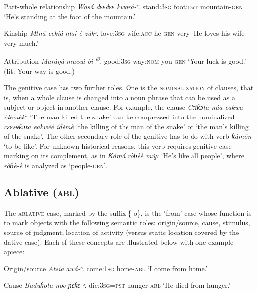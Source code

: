 Part-whole relationship
\textit{Wasá     dɛɛdɛɛ   kwará-}\textit{ᵉ}.
stand:\textsc{3sg}   foot:\textsc{dat}   mountain-\textsc{gen}
‘He’s standing at the foot of the mountain.’




Kinship
\textit{Mɨná     cekíá     ntsí-}\textit{é}\textit{     zùkᵘ.}
love:\textsc{3sg}   wife:\textsc{acc}   he-\textsc{gen}   very
‘He loves his wife very much.’




Attribution
\textit{Maráŋá   muceá   bì-}\textit{\textsuperscript{Ø}}.
good:\textsc{3sg}   way:\textsc{nom}   you-\textsc{gen}
‘Your luck is good.’ (lit: Your way is good.)


The genitive case has two further roles. One is the \textsc{nominalization} of clauses, that is, when a whole clause is changed into a noun phrase that can be used as a subject or object in another clause. For example, the clause \textit{Cɛɨƙɔta náa eakwa ídèmèkᵃ }‘The man killed the snake’ can be compressed into the nominalized \textit{cɛɛsʉƙɔta eakwéé ídèmè }‘the killing of the man of the snake’ or ‘the man’s killing of the snake’. The other secondary role of the genitive has to do with verb \textit{ƙámón }‘to be like’. For unknown historical reasons, this verb requires genitive case marking on its complement, as in \textit{Ƙámá ròɓèè mùɲ} ‘He’s like all people’, where \textit{ròɓè-è }is analyzed as ‘people-\textsc{gen’}.





\subsection{Ablative (\textsc{abl})}


The \textsc{ablative }case, marked by the suffix \{-o\}, is the ‘from’ case whose function is to mark objects with the following semantic roles: origin/source, cause, stimulus, source of judgment, location of activity (versus static location covered by the dative case). Each of these concepts are illustrated below with one example apiece:




Origin/source
\textit{Atsía     awá-}\textit{ᵒ}.
come:\textsc{1sg}   home-\textsc{abl}
‘I come from home.’




Cause
\textit{Baduƙota noo   ɲɛƙɛ{}-}\textit{ᵓ}.
die:\textsc{3sg}=\textsc{pst}     hunger-\textsc{abl}
‘He died from hunger.’




